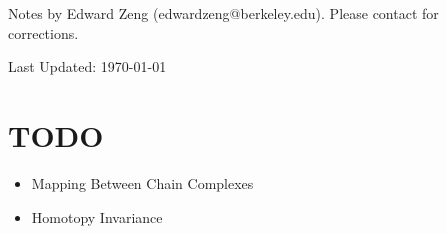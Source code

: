 \def\topic{Simplicial Homology}



    \begin{center}
        \color{blue}
        \textsf{Notes by Edward Zeng (edwardzeng@berkeley.edu). Please contact for corrections.}

        \color{red}
        \textsf{Last Updated: \today}
    \end{center}

    
    
    \newpage
    
    \newpage
    
    \newpage
    

    \newpage
    \section{TODO}
    \begin{itemize}
        \item Mapping Between Chain Complexes
        \item Homotopy Invariance
    \end{itemize}


